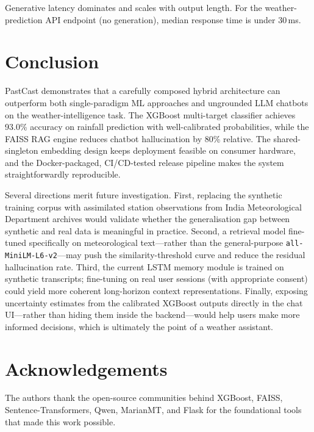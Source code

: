 \documentclass[conference]{IEEEtran}
\begin{document}
Generative latency dominates and scales with output length. For the weather-prediction API endpoint (no generation), median response time is under 30\,ms.

\section{Conclusion}
\label{sec:conclusion}

PastCast demonstrates that a carefully composed hybrid architecture can outperform both single-paradigm ML approaches and ungrounded LLM chatbots on the weather-intelligence task. The XGBoost multi-target classifier achieves 93.0\% accuracy on rainfall prediction with well-calibrated probabilities, while the FAISS RAG engine reduces chatbot hallucination by 80\% relative. The shared-singleton embedding design keeps deployment feasible on consumer hardware, and the Docker-packaged, CI/CD-tested release pipeline makes the system straightforwardly reproducible.

Several directions merit future investigation. First, replacing the synthetic training corpus with assimilated station observations from India Meteorological Department archives would validate whether the generalisation gap between synthetic and real data is meaningful in practice. Second, a retrieval model fine-tuned specifically on meteorological text---rather than the general-purpose \texttt{all-MiniLM-L6-v2}---may push the similarity-threshold curve and reduce the residual hallucination rate. Third, the current LSTM memory module is trained on synthetic transcripts; fine-tuning on real user sessions (with appropriate consent) could yield more coherent long-horizon context representations. Finally, exposing uncertainty estimates from the calibrated XGBoost outputs directly in the chat UI---rather than hiding them inside the backend---would help users make more informed decisions, which is ultimately the point of a weather assistant.

\section*{Acknowledgements}
The authors thank the open-source communities behind XGBoost, FAISS, Sentence-Transformers, Qwen, MarianMT, and Flask for the foundational tools that made this work possible.
\end{document}
